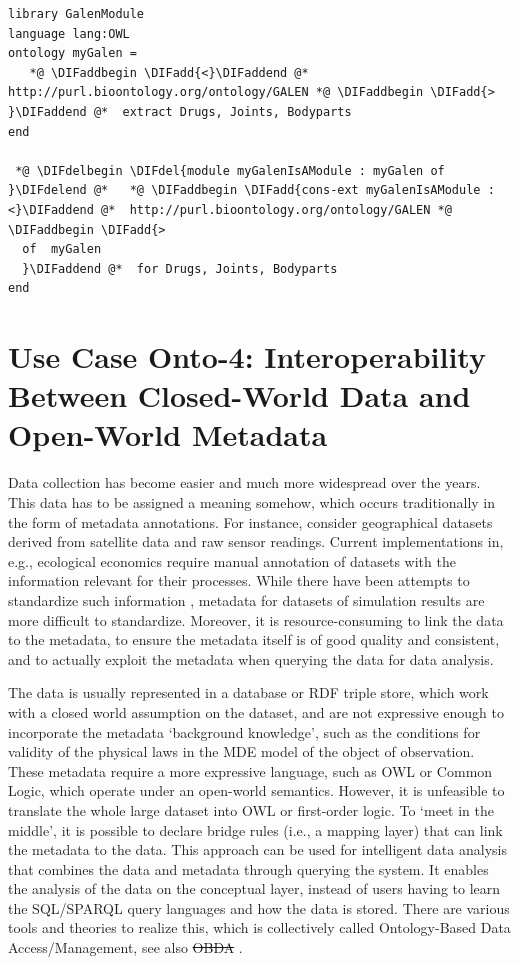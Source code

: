 \documentclass[10pt,fleqn,final]{scrreprt}
\newcommand*{\termref}[1]{\index{#1}#1\xspace}
\providecommand{\DIFadd}[1]{{\protect\color{blue}\uwave{#1}}} %
\providecommand{\DIFdel}[1]{{\protect\color{red}\sout{#1}}}                      %
\providecommand{\DIFaddbegin}{} %
\providecommand{\DIFaddend}{} %
\providecommand{\DIFdelbegin}{} %
\providecommand{\DIFdelend}{} %
\begin{document}
 \begin{lstlisting}[basicstyle=\ttfamily,language=dolText,escapechar=@,mathescape]
  %prefix( lang:  <http://purl.net/DOL/languages/> )%
library GalenModule
language lang:OWL
ontology myGalen = 
   *@ \DIFaddbegin \DIFadd{<}\DIFaddend @*  http://purl.bioontology.org/ontology/GALEN *@ \DIFaddbegin \DIFadd{> }\DIFaddend @*  extract Drugs, Joints, Bodyparts
end

 *@ \DIFdelbegin \DIFdel{module myGalenIsAModule : myGalen of }\DIFdelend @*   *@ \DIFaddbegin \DIFadd{cons-ext myGalenIsAModule : <}\DIFaddend @*  http://purl.bioontology.org/ontology/GALEN *@ \DIFaddbegin \DIFadd{>
  of  myGalen 
  }\DIFaddend @*  for Drugs, Joints, Bodyparts
end
\end{lstlisting}



\section{Use Case Onto-4: Interoperability Between Closed-World Data and Open-World Metadata}
Data collection has become easier and much more widespread over the years. This data has to be 
assigned a meaning somehow, which occurs traditionally in the  form of metadata annotations. For 
instance, consider geographical datasets derived from satellite data and raw sensor readings. 
Current implementations in, e.g., ecological economics \cite{bagstad_aries_2011} require manual 
annotation of datasets with the information relevant for their processes. While there have been 
attempts to standardize such information \cite{european_comission_inspire_2014}, metadata for 
datasets of simulation results are more difficult to standardize. Moreover, it is 
resource-consuming to link the data to the metadata, to ensure the metadata itself is of good 
quality and consistent, and to actually exploit the metadata when querying the data for data 
analysis. 

The data is usually represented in a database or RDF triple store, which work with a \termref{closed world assumption} on the dataset, and are not expressive enough to 
incorporate the metadata `background knowledge', such as the conditions for validity of the physical laws in the MDE model of the object of observation. These metadata 
require a more expressive language, such as OWL or Common Logic, which operate under an open-world semantics. However, it is unfeasible to translate the 
whole large dataset into OWL or first-order logic. To `meet in the middle', it is possible to declare bridge rules (i.e., a mapping layer) that can link the metadata to 
the data. This approach can be used for intelligent data analysis that combines the data and metadata through querying the system. It enables the analysis of the 
data on the conceptual layer, instead of users having to learn the SQL/SPARQL query languages and how the data is stored. There are various tools and theories 
to realize this, which is collectively called Ontology-Based Data Access/Management, see also \DIFdelbegin %
\DIFdel{OBDA}%
\DIFdelend \DIFaddbegin \DIFadd{\mbox{%
\cite{CalvaneseEtAl11}
}%
}\DIFaddend .
\end{document}
